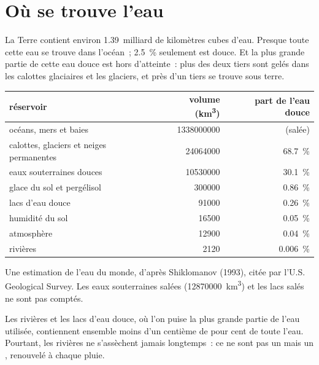 \section{Où se trouve l'eau}

La Terre contient environ 1.39~milliard de kilomètres cubes d'eau. Presque
toute cette eau se trouve dans l'océan~; \qty{2.5}{\percent} seulement est
douce. Et la plus grande partie de cette eau douce est hors d'atteinte~:
plus des deux tiers sont gelés dans les calottes glaciaires et les
glaciers, et près d'un tiers se trouve sous terre.

\begin{center}
\small
\begin{tabular}{|l|r|r|}
\hline
\textbf{réservoir} & \textbf{volume (\unit{km^3})} & \textbf{part de l'eau douce} \\ \hline
océans, mers et baies & \num{1338000000} & (salée) \\ \hline
calottes, glaciers et neiges permanentes & \num{24064000} & \qty{68.7}{\percent} \\ \hline
eaux souterraines douces & \num{10530000} & \qty{30.1}{\percent} \\ \hline
glace du sol et pergélisol & \num{300000} & \qty{0.86}{\percent} \\ \hline
lacs d'eau douce & \num{91000} & \qty{0.26}{\percent} \\ \hline
humidité du sol & \num{16500} & \qty{0.05}{\percent} \\ \hline
atmosphère & \num{12900} & \qty{0.04}{\percent} \\ \hline
rivières & \num{2120} & \qty{0.006}{\percent} \\ \hline
\end{tabular}

{\small Une estimation de l'eau du monde, d'après Shiklomanov (1993), citée
par l'U.S. Geological Survey. Les eaux souterraines salées
(\num{12870000}~\unit{km^3}) et les lacs salés ne sont pas comptés.}
\end{center}

Les rivières et les lacs d'eau douce, où l'on puise la plus grande partie
de l'eau utilisée, contiennent ensemble moins d'un centième de pour cent de
toute l'eau. Pourtant, les rivières ne s'assèchent jamais longtemps~: ce ne
sont pas un  mais un , renouvelé à chaque pluie.

